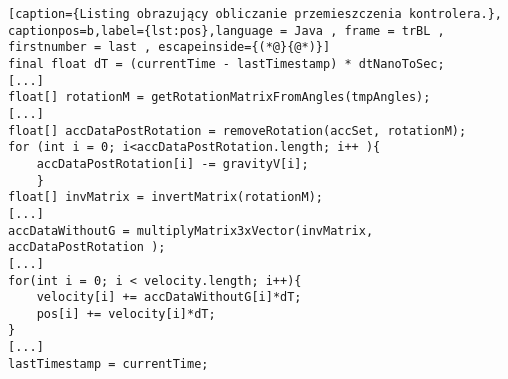 	\begin{lstlisting}[caption={Listing obrazujący obliczanie przemieszczenia kontrolera.}, captionpos=b,label={lst:pos},language = Java , frame = trBL , firstnumber = last , escapeinside={(*@}{@*)}]  
final float dT = (currentTime - lastTimestamp) * dtNanoToSec;
[...]	   
float[] rotationM = getRotationMatrixFromAngles(tmpAngles);
[...]
float[] accDataPostRotation = removeRotation(accSet, rotationM);
for (int i = 0; i<accDataPostRotation.length; i++ ){
	accDataPostRotation[i] -= gravityV[i];
    }
float[] invMatrix = invertMatrix(rotationM);
[...]
accDataWithoutG = multiplyMatrix3xVector(invMatrix, accDataPostRotation );
[...]
for(int i = 0; i < velocity.length; i++){
	velocity[i] += accDataWithoutG[i]*dT;
	pos[i] += velocity[i]*dT;
}
[...]
lastTimestamp = currentTime;
\end{lstlisting}
	
